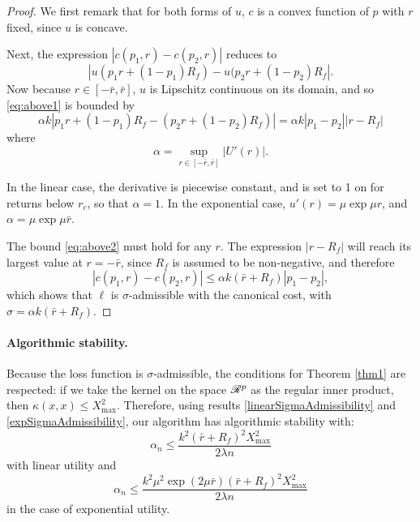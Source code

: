 \begin{proof}We first remark that for both forms of $u$, $c$ is a convex function of $p$
  with $r$ fixed, since $u$ is concave.

Next, the expression $|c(p_1,r)-c(p_2,r)|$ reduces to
\begin{equation}
  \label{eq:above1} 
  |u(p_1r + (1-p_1)R_f) - u(p_2r + (1-p_2)R_f|.
\end{equation} Now because $r\in[-\bar r,\bar r]$, $u$ is Lipschitz continuous on its
domain, and so \eqref{eq:above1} is bounded by
\begin{equation}
  \label{eq:above2} 
  \alpha k|p_1r + (1-p_1)R_f - (p_2r + (1-p_2)R_f)| = \alpha k|p_1-p_2||r-R_f|
\end{equation} 
where
\begin{equation*} 
  \alpha = \sup_{r\in[-\bar r,\bar r]} |U'(r)|.
\end{equation*}

In the linear case, the derivative is piecewise constant, and is set to 1 on for returns
below $r_c$, so that $\alpha=1$. In the exponential case, $u'(r) = \mu\exp\mu r$, and $\alpha
= \mu\exp \mu \bar r$.

The bound \eqref{eq:above2} must hold for any $r$. The expression $|r-R_f|$ will reach
its largest value at $r=-\bar r$, since $R_f$ is assumed to be non-negative, and therefore
\begin{equation*} 
  |c(p_1,r) - c(p_2,r)| \leq \alpha k(\bar r + R_f)|p_1-p_2|,
\end{equation*} 
which shows that $\ell$ is $\sigma$-admissible with the canonical cost,
with $\sigma=\alpha k(\bar r+ R_f)$.
\end{proof}


\paragraph{Algorithmic stability.}
Because the loss function is $\sigma$-admissible, the conditions for Theorem \ref{thm1}
are respected: if we take the kernel on the space $\mathscr{R}^p$ as the regular inner product,
then $\kappa(x,x)\leq X^2_{\max}$. Therefore, using results
\eqref{linearSigmaAdmissibility} and \eqref{expSigmaAdmissibility}, our algorithm has
algorithmic stability with:
\begin{equation}
  \label{algoStabilityLinear}
  \alpha_n \leq \frac{k^2(\bar r+R_f)^2X^2_{\max}}{2\lambda n}
\end{equation}
 with linear utility and
\begin{equation*}
   \alpha_n \leq \frac{k^2 \mu^2 \exp(2\mu\bar r)(\bar r + R_f)^2 X^2_{\max}}{2\lambda n}
\end{equation*}
in the case of exponential utility.

